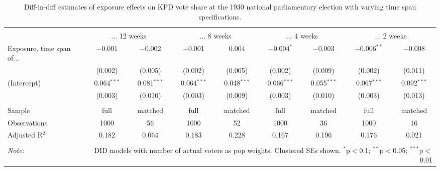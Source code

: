 
\begin{table}[!htbp] \centering 
  \caption{Diff-in-diff estimates of exposure effects on KPD vote share at the 1930 national parliamentary election with varying time span specifications.\vspace{-.25cm}} 
  \label{tab:nsdap-voteshare-kpd-timespan-dd-1930} 
\scriptsize 
\begin{tabular}{@{\extracolsep{5pt}}lcccccccc} 
\\[-1.8ex]\hline 
\hline \\[-1.8ex] 
 & \multicolumn{2}{c}{... 12 weeks} & \multicolumn{2}{c}{... 8 weeks} & \multicolumn{2}{c}{... 4 weeks} & \multicolumn{2}{c}{... 2 weeks} \\ 
 \cmidrule(r){2-3}\cmidrule(r){4-5}\cmidrule(r){6-7}\cmidrule(r){8-9}Exposure, time span of... & $-$0.001 & $-$0.002 & $-$0.001 & 0.004 & $-$0.004$^{*}$ & $-$0.003 & $-$0.006$^{**}$ & $-$0.008 \\ 
  & (0.002) & (0.005) & (0.002) & (0.005) & (0.002) & (0.009) & (0.002) & (0.011) \\ 
  (Intercept) & 0.064$^{***}$ & 0.081$^{***}$ & 0.064$^{***}$ & 0.048$^{***}$ & 0.066$^{***}$ & 0.055$^{***}$ & 0.067$^{***}$ & 0.092$^{***}$ \\ 
  & (0.003) & (0.010) & (0.003) & (0.009) & (0.003) & (0.010) & (0.003) & (0.013) \\ 
 \hline \\[-1.8ex] 
Sample & full & matched & full & matched & full & matched & full & matched \\ 
Observations & 1000 & 56 & 1000 & 52 & 1000 & 36 & 1000 & 16 \\ 
Adjusted R$^{2}$ & 0.182 & 0.064 & 0.183 & 0.228 & 0.167 & 0.196 & 0.176 & 0.021 \\ 
\hline 
\hline \\[-1.8ex] 
\textit{Note:}  & \multicolumn{8}{r}{DID models with number of actual voters as pop weights. Clustered SEs shown. $^{*}$p$<$0.1; $^{**}$p$<$0.05; $^{***}$p$<$0.01} \\ 
\end{tabular} 
\end{table} 
